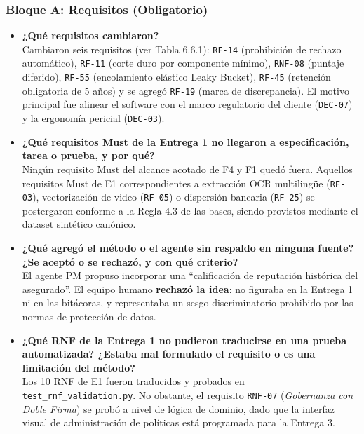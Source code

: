 \documentclass[11pt,letterpaper]{article}
\begin{document}
\subsubsection{Bloque A: Requisitos (Obligatorio)}
\begin{itemize}
    \item \textbf{¿Qué requisitos cambiaron?}\\
    Cambiaron seis requisitos (ver Tabla 6.6.1): \texttt{RF-14} (prohibición de rechazo automático), \texttt{RF-11} (corte duro por componente mínimo), \texttt{RNF-08} (puntaje diferido), \texttt{RF-55} (encolamiento elástico Leaky Bucket), \texttt{RF-45} (retención obligatoria de 5 años) y se agregó \texttt{RF-19} (marca de discrepancia). El motivo principal fue alinear el software con el marco regulatorio del cliente (\texttt{DEC-07}) y la ergonomía pericial (\texttt{DEC-03}).
    \item \textbf{¿Qué requisitos Must de la Entrega 1 no llegaron a especificación, tarea o prueba, y por qué?}\\
    Ningún requisito Must del alcance acotado de F4 y F1 quedó fuera. Aquellos requisitos Must de E1 correspondientes a extracción OCR multilingüe (\texttt{RF-03}), vectorización de video (\texttt{RF-05}) o dispersión bancaria (\texttt{RF-25}) se postergaron conforme a la Regla 4.3 de las bases, siendo provistos mediante el dataset sintético canónico.
    \item \textbf{¿Qué agregó el método o el agente sin respaldo en ninguna fuente? ¿Se aceptó o se rechazó, y con qué criterio?}\\
    El agente PM propuso incorporar una ``calificación de reputación histórica del asegurado''. El equipo humano \textbf{rechazó la idea}: no figuraba en la Entrega 1 ni en las bitácoras, y representaba un sesgo discriminatorio prohibido por las normas de protección de datos.
    \item \textbf{¿Qué RNF de la Entrega 1 no pudieron traducirse en una prueba automatizada? ¿Estaba mal formulado el requisito o es una limitación del método?}\\
    Los 10 RNF de E1 fueron traducidos y probados en \texttt{test\_rnf\_validation.py}. No obstante, el requisito \texttt{RNF-07} (\textit{Gobernanza con Doble Firma}) se probó a nivel de lógica de dominio, dado que la interfaz visual de administración de políticas está programada para la Entrega 3.
\end{itemize}
\end{document}
